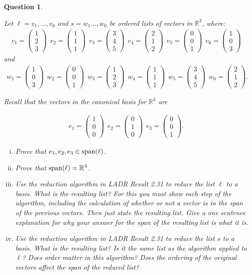 \documentclass[12pt]{article}
\newtheorem{question}[thm]{Question}
\def\real{{\mathbb R}}
\def\SpanLA{\textnormal{span}}
\newcommand{\ColVecThree}[3]{\begin{pmatrix} #1\\ #2\\ #3\end{pmatrix}}
\begin{document}
\begin{question}\label{que:ReductionAlgorithm}
	\normalfont
	
	
	Let $\ell=v_1,\dots, v_6$ and $s=w_1\dots,w_6$ be ordered lists of vectors in $\real^3$, where:
	\begin{align*}
		v_1 = \ColVecThree{1}{2}{3}\ \ 
		v_2 = \ColVecThree{1}{1}{1}\ \
		v_3 = \ColVecThree{3}{4}{5}\ \ 
		v_4 = \ColVecThree{2}{1}{2}\ \ 
		v_5 = \ColVecThree{0}{0}{1}\ \ 
		v_6 = \ColVecThree{1}{0}{3}
	\end{align*}
	and
	\begin{align*}
		w_1 = \ColVecThree{1}{0}{3}\ \ 
		w_2 = \ColVecThree{0}{0}{1}\ \
		w_3 = \ColVecThree{1}{2}{3}\ \ 
		w_4 = \ColVecThree{1}{1}{1}\ \ 
		w_5 = \ColVecThree{3}{4}{5}\ \ 
		w_6 = \ColVecThree{2}{1}{2}.
	\end{align*}
	
	\vspace{.2cm}
	
	Recall that the vectors in the canonical basis for $\real^3$ are
	
	\begin{align*}
		e_1 = \ColVecThree{1}{0}{0}\ \
		e_2 = \ColVecThree{0}{1}{0}\ \
		e_3 = \ColVecThree{0}{0}{1}. 
	\end{align*}
	
	\vspace{.2cm}
	\begin{enumerate}[(i)]
		\item Prove that $e_1,e_2,e_3\in\SpanLA(\ell)$.
		\item Prove that $\SpanLA(\ell)=\real^3$.
		\item Use the reduction algorithm in LADR Result 2.31 to reduce the list $\ell$ to a basis.  What is the resulting list?    For this you must show each step of the algorithm, including the calculation of whether or not a vector is in the span of the previous vectors.  Then just state the resulting list.  Give a one sentence explanation for why your answer for the span of the resulting list is what it is.
		\item Use the reduction algorithm in LADR Result 2.31 to reduce the list $s$ to a basis.  What is the resulting list?  Is it the same list as the algorithm applied to $\ell$?  Does order matter in this algorithm?  Does the ordering of the original vectors affect the span of the reduced list?
	\end{enumerate}
\end{question}

\vspace{.3cm}
\end{document}
